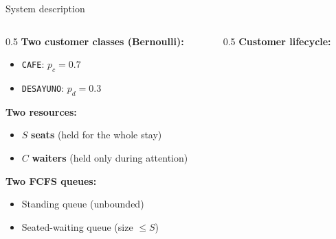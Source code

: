 \documentclass[10pt,aspectratio=169]{beamer}
\begin{document}
\begin{frame}{System description}
\begin{columns}[T]
\begin{column}{0.5\textwidth}
\textbf{Two customer classes (Bernoulli):}
\begin{itemize}
  \item \texttt{CAFE}: $p_c = 0.7$
  \item \texttt{DESAYUNO}: $p_d = 0.3$
\end{itemize}

\vspace{0.4cm}
\textbf{Two resources:}
\begin{itemize}
  \item $S$ \textbf{seats} (held for the whole stay)
  \item $C$ \textbf{waiters} (held only during attention)
\end{itemize}

\vspace{0.4cm}
\textbf{Two FCFS queues:}
\begin{itemize}
  \item Standing queue (unbounded)
  \item Seated-waiting queue (size $\le S$)
\end{itemize}
\end{column}
\begin{column}{0.5\textwidth}
\textbf{Customer lifecycle:}

\begin{small}
\end{small}
\end{column}
\end{columns}
\end{frame}
\end{document}
